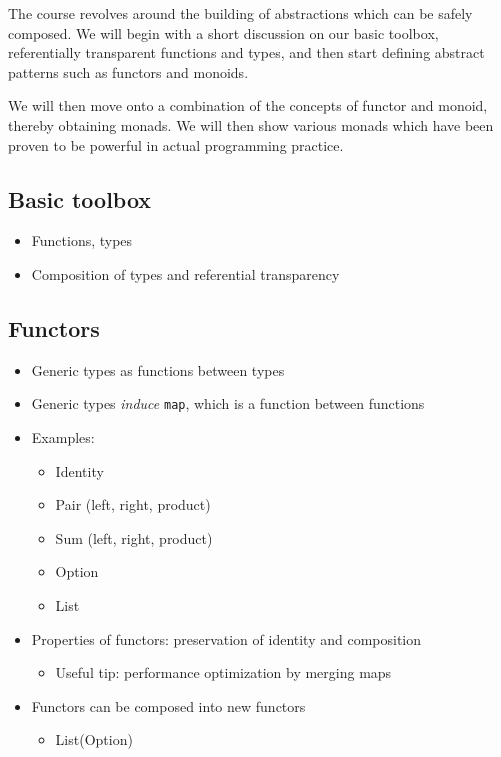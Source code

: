 \documentclass{article}
\begin{document}
The course revolves around the building of abstractions which can be
safely composed. We will begin with a short discussion on our basic
toolbox, referentially transparent functions and types, and then start
defining abstract patterns such as functors and monoids.

We will then move onto a combination of the concepts of functor and
monoid, thereby obtaining monads. We will then show various monads which
have been proven to be powerful in actual programming practice.

\subsection{Basic toolbox}\label{basic-toolbox}

\begin{itemize}[noitemsep]
	\item
	Functions, types
	\item
	Composition of types and referential transparency
\end{itemize}

\subsection{Functors}\label{functors}

\begin{itemize}[noitemsep]

	\item
	Generic types as functions between types
	\item
	Generic types \emph{induce} \texttt{map}, which is a function between
	functions
	\item
	Examples:
	
	\begin{itemize}[noitemsep]

		\item
		Identity
		\item
		Pair (left, right, product)
		\item
		Sum (left, right, product)
		\item
		Option
		\item
		List
	\end{itemize}
	\item
	Properties of functors: preservation of identity and composition
	
	\begin{itemize}[noitemsep]

		\item
		Useful tip: performance optimization by merging maps
	\end{itemize}
	\item
	Functors can be composed into new functors
	
	\begin{itemize}[noitemsep]

		\item
		List(Option)
	\end{itemize}
\end{itemize}
\end{document}
